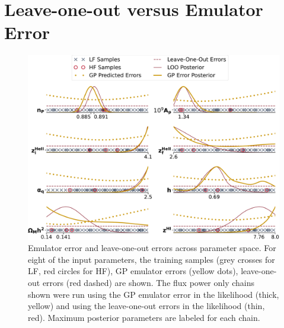 \documentclass[a4paper,11pt]{article}
\begin{document}


\section{Leave-one-out versus Emulator Error}
\label{sec:loovsgperr}
\begin{figure}
    \centering
    \includegraphics[width=\textwidth]{figures/loo_vs_emu_error_wlegend.pdf}
    \caption{\label{fig:loo_v_emu}
    Emulator error and leave-one-out errors across parameter space.
    For eight of the input parameters, the training samples (grey crosses for LF, red circles for HF), GP emulator errors (yellow dots), leave-one-out errors (red dashed) are shown.
    The flux power only chains shown were run using the GP emulator error in the likelihood (thick, yellow) and using the leave-one-out errors in the likelihood (thin, red).
    Maximum posterior parameters are labeled for each chain.
    }
\end{figure}
\end{document}
